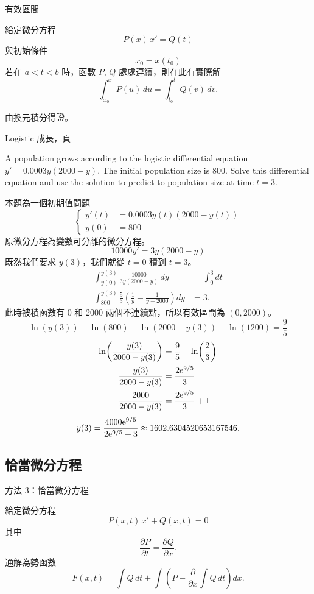 \documentclass{beamer}
\newcommand{\Left} {\mathopen{}\mathclose\bgroup\left}
\newcommand{\Right}{\aftergroup\egroup\right}
\newcommand  {\e}{\textup e}
\theoremstyle{remark}
\begin{document}
\begin{CJK}{UTF8}{bsmi}
\begin{frame}{有效區間}
  \begin{theorem}
    給定微分方程
    \[ P(x)\,x' = Q(t) \]
    與初始條件
    \[ x_0 = x(t_0) \]
    若在 $a < t < b$ 時，函數 $P$, $Q$ 處處連續，則在此有實際解
    \[ \int_{x_0}^x P(u)\,du = \int_{t_0}^t Q(v)\,dv.\]
  \end{theorem}

  由換元積分得證。
\end{frame}

\begin{frame}[allowframebreaks]{Logistic 成長，頁}
  \begin{example}
    A population grows according to the logistic differential equation $y' = 0.0003y \left( 2000-y \right)$. The initial
    population size is 800. Solve this differential equation and use the solution to predict to population size at time
    $t=3$.
  \end{example}
  本題為一個初期值問題
  \[\left\{ \begin{aligned}
      y'(t) &= 0.0003y(t) \left( 2000-y(t) \right)\\
      y(0)  &= 800
    \end{aligned} \right.\]
  原微分方程為變數可分離的微分方程。
  \[10000y' = 3y \left( 2000 - y \right)\]
  既然我們要求 $y(3)$，我們就從 $t=0$ 積到 $t=3$。
  \begin{align*}
    \int_{y(0)}^{y(3)} \frac{10000}{3y \left( 2000 - y \right)}\,dy &= \int_0^3 dt\\
    \int_{800}^{y(3)} \frac53 \left( \frac1y - \frac{1}{y-2000} \right) dy &= 3.
  \end{align*}
  此時被積函數有 0 和 2000 兩個不連續點，所以有效區間為 $(0, 2000)$。
  \[\ln(y(3)) - \ln(800) - \ln(2000 - y(3)) + \ln(1200) = \frac95\]
  \begin{align*}
    \ln \Left( \frac{y(3)}{2000-y(3)} \Right) &= \frac95 + \ln \Left( \frac23 \Right)\\
    \frac{y(3)}{2000-y(3)} &= \frac{2\e^{9/5}}{3}\\
    \frac{2000}{2000-y(3)} &= \frac{2\e^{9/5}}{3} + 1
  \end{align*}
  \[y(3) = \frac{4000\e^{9/5}}{2\e^{9/5}+3} \approx 1602.6304520653167546.\]
\end{frame}

\subsection[恰當--積分因子]{恰當微分方程}
\begin{frame}{方法 3：恰當微分方程}
  \begin{theorem}
    給定微分方程
    \[P(x,t)\,x' + Q(x,t) = 0\]
    其中
    \begin{equation*}
      \frac{\partial P}{\partial t} = \frac{\partial Q}{\partial x}.
    \end{equation*}
    通解為勢函數
    \[F(x,t) = \int Q\,dt + \int \left( P - \frac{\partial}{\partial x} \int Q\,dt \right) dx.\]
  \end{theorem}
\end{frame}


\end{CJK}
\end{document}

